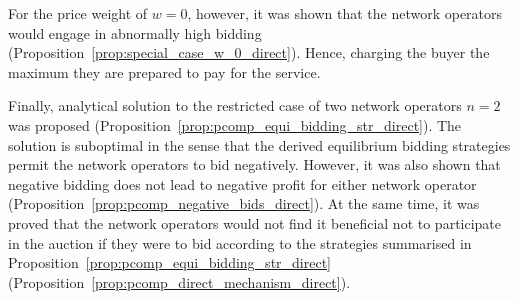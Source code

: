 For the price weight of $w=0$, however, it was shown that the network operators would engage in abnormally high bidding (Proposition~\ref{prop:special_case_w_0_direct}). Hence, charging the buyer the maximum they are prepared to pay for the service.

Finally, analytical solution to the restricted case of two network operators $n=2$ was proposed (Proposition~\ref{prop:pcomp_equi_bidding_str_direct}). The solution is suboptimal in the sense that the derived equilibrium bidding strategies permit the network operators to bid negatively. However, it was also shown that negative bidding does not lead to negative profit for either network operator (Proposition~\ref{prop:pcomp_negative_bids_direct}). At the same time, it was proved that the network operators would not find it beneficial not to participate in the auction if they were to bid according to the strategies summarised in Proposition~\ref{prop:pcomp_equi_bidding_str_direct} (Proposition~\ref{prop:pcomp_direct_mechanism_direct}).
